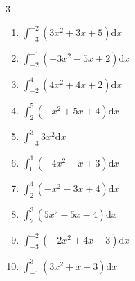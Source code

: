 \begin{multicols}{3}
\begin{enumerate}
        \phantom{$\displaystyle =-11$}

  \item $\displaystyle \int_{-3}^{-2}\left( 3x^{2}+3x+5 \right) \mathrm{d}x$


  \item $\displaystyle \int_{-2}^{-1}\left( -3x^{2}-5x+2 \right) \mathrm{d}x$


  \item $\displaystyle \int_{-2}^{4}\left( 4x^{2}+4x+2 \right) \mathrm{d}x$

        \phantom{$\displaystyle =122$}

\columnbreak %

  \item $\displaystyle \int_{2}^{5}\left( -x^{2}+5x+4 \right) \mathrm{d}x$


  \item $\displaystyle \int_{-3}^{3}3x^{2} \mathrm{d}x$

        \phantom{$\displaystyle =54$}

  \item $\displaystyle \int_{0}^{1}\left( -4x^{2}-x+3 \right) \mathrm{d}x$


  \item $\displaystyle \int_{2}^{4}\left( -x^{2}-3x+4 \right) \mathrm{d}x$


  \item $\displaystyle \int_{2}^{3}\left( 5x^{2}-5x-4 \right) \mathrm{d}x$


\columnbreak %

\resetques

  \item $\displaystyle \int_{-3}^{-2}\left( -2x^{2}+4x-3 \right) \mathrm{d}x$


  \item $\displaystyle \int_{-1}^{3}\left( 3x^{2}+x+3 \right) \mathrm{d}x$

        \phantom{$\displaystyle =34$}


\end{enumerate}
\end{multicols}
